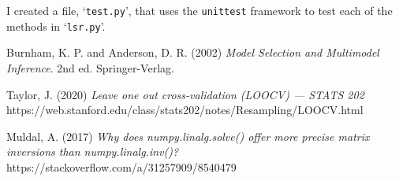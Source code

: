 \documentclass[onecolumn, 12pt, a4paper]{article}
\begin{document}
I created a file, `\texttt{test.py}', that uses the
\texttt{unittest} framework to test each of the methods
in `\texttt{lsr.py}'.

\begin{thebibliography}{9}

    Burnham, K. P. and Anderson, D. R. (2002)
    \textit{Model Selection and Multimodel Inference}.
    2nd ed. Springer-Verlag.

    Taylor, J. (2020)
    \textit{Leave one out cross-validation (LOOCV) --- STATS 202}
    https://web.stanford.edu/class/stats202/notes/Resampling/LOOCV.html

    Muldal, A. (2017)
    \textit{Why does numpy.linalg.solve() offer more precise matrix inversions than numpy.linalg.inv()?}
    https://stackoverflow.com/a/31257909/8540479



\end{thebibliography}
    
\end{document}
